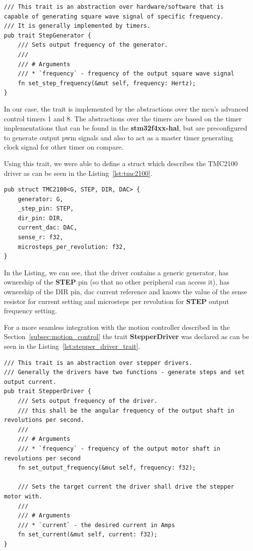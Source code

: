 \begin{lstlisting}[caption={Trait for abstracting STEP generation.},label=lst:step_gen_trait]
/// This trait is an abstraction over hardware/software that is capable of generating square wave signal of specific frequency.
/// It is generally implemented by timers.
pub trait StepGenerator {
    /// Sets output frequency of the generator.
    ///
    /// # Arguments
    /// * `frequency` - frequency of the output square wave signal
    fn set_step_frequency(&mut self, frequency: Hertz);
}
\end{lstlisting}

In our case, the trait is implemented by the abstractions over the \acs{mcu}'s advanced control timers 1 and 8.
The abstractions over the timers are based on the timer implementations that can be found in the \textbf{stm32f4xx-hal}, but are preconfigured to generate output \acs{pwm} signals and also to act as a master timer generating clock signal for other timer on compare.

Using this trait, we were able to define a struct which describes the TMC2100 driver as can be seen in the Listing~\ref{lst:tmc2100}.

\begin{lstlisting}[caption={TMC2100 driver.},label=lst:tmc2100]
pub struct TMC2100<G, STEP, DIR, DAC> {
    generator: G,
    _step_pin: STEP,
    dir_pin: DIR,
    current_dac: DAC,
    sense_r: f32,
    microsteps_per_revolution: f32,
}
\end{lstlisting}
In the Listing, we can see, that the driver contains a generic generator, has ownership of the \textbf{STEP} pin (so that no other peripheral can access it), has ownership of the \acs{DIR} pin, \acs{dac} current reference and knows the value of the sense resistor for current setting and microsteps per revolution for \textbf{STEP} output frequency setting.

For a more seamless integration with the motion controller described in the Section~\ref{subsec:motion_control} the trait \textbf{StepperDriver} was declared as can be seen in the Listing~\ref{lst:stepper_driver_trait}.

\begin{lstlisting}[caption={Trait for abstracting the stepper motor driver IC.},label=lst:stepper_driver_trait]
/// This trait is an abstraction over stepper drivers.
/// Generally the drivers have two functions - generate steps and set output current.
pub trait StepperDriver {
    /// Sets output frequency of the driver.
    /// this shall be the angular frequency of the output shaft in revolutions per second.
    ///
    /// # Arguments
    /// * `frequency` - frequency of the output motor shaft in revolutions per second
    fn set_output_frequency(&mut self, frequency: f32);

    /// Sets the target current the driver shall drive the stepper motor with.
    ///
    /// # Arguments
    /// * `current` - the desired current in Amps
    fn set_current(&mut self, current: f32);
}
\end{lstlisting}

